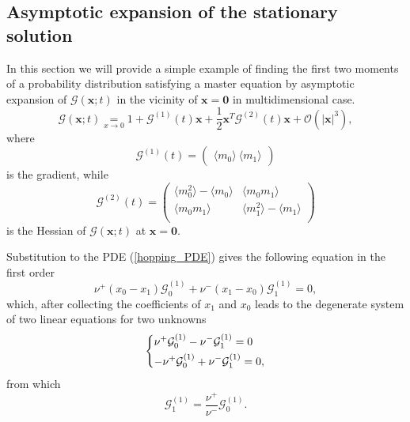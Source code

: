 \documentclass[a4paper, 11pt]{article}
\newcommand\underl[2]{\mathrel{\mathop{#2}\limits_{#1}}}
\begin{document}
\subsection{Asymptotic expansion of the stationary solution}
In this section we will provide a simple example of finding the first two moments of a probability distribution satisfying a master equation by asymptotic expansion of $\mathcal G(\mathbf x; t)$ in the vicinity of $\mathbf x = \mathbf 0$ in multidimensional case.
\begin{equation}\label{eqn:basic_expansion}
  \mathcal G(\mathbf x; t)\underl{x\to 0}{=} 1 + \boldsymbol{\mathcal G}^{(1)}(t)\mathbf x + \frac{1}{2}\mathbf x^T\boldsymbol{\mathcal G}^{(2)}(t)\mathbf x + \mathcal O(|\mathbf x|^3),
\end{equation}
where
\begin{equation}\label{eqn:G1_through_expectations}
  \boldsymbol{\mathcal G}^{(1)}(t) =
  \begin{pmatrix}
    \langle m_0\rangle\ 
    \langle m_1 \rangle
  \end{pmatrix}
\end{equation}
is the gradient, while
\begin{equation}\label{eqn:G2_through_correlations}
  \boldsymbol{\mathcal G}^{(2)}(t) =
  \left( \begin{array}{cc}
    \langle m_0^2 \rangle - \langle m_0\rangle & \langle m_0m_1\rangle\\
    \langle m_0m_1\rangle & \langle m_1^2 \rangle - \langle m_1\rangle \\
  \end{array} \right)
\end{equation}
is the Hessian of $\mathcal G(\mathbf x; t)$ at $\mathbf x = \mathbf 0$.

Substitution to the PDE (\ref{hopping_PDE}) gives the following equation in the first order
\begin{equation*}
  \nu^+(x_0-x_1)\mathcal G_0^{(1)} + \nu^-(x_1-x_0)\mathcal G_1^{(1)}=0,
\end{equation*}
which, after collecting the coefficients of $x_1$ and $x_0$ leads to the degenerate system of two linear equations for two unknowns
\begin{equation*}
  \begin{dcases}
    \nu^+\mathcal G_0^{(1)} - \nu^-\mathcal G_1^{(1)} = 0\\
    -\nu^+\mathcal G_0^{(1)} + \nu^-\mathcal G_1^{(1)} = 0,
  \end{dcases}
\end{equation*}
from which
\begin{equation*}
  \mathcal G_1^{(1)} = \frac{\nu^+}{\nu^-}\mathcal G_0^{(1)}.
\end{equation*}
\end{document}
